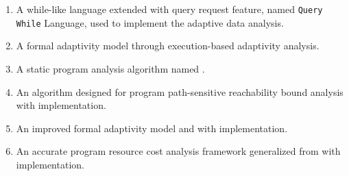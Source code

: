    \begin{enumerate}
   
      \item A while-like language extended with query request feature, named {\tt Query While} Language, 
      used to implement 
      the adaptive data analysis.
      \item A formal adaptivity model through execution-based adaptivity analysis.
      \item A static program analysis algorithm named {\THESYSTEM}.
      \item An algorithm designed for program path-sensitive reachability bound analysis with implementation.
      \item An improved formal adaptivity model and {\THESYSTEM} with implementation.
      \item An accurate program resource cost analysis framework generalized from {\THESYSTEM} with implementation.
   \end{enumerate}




